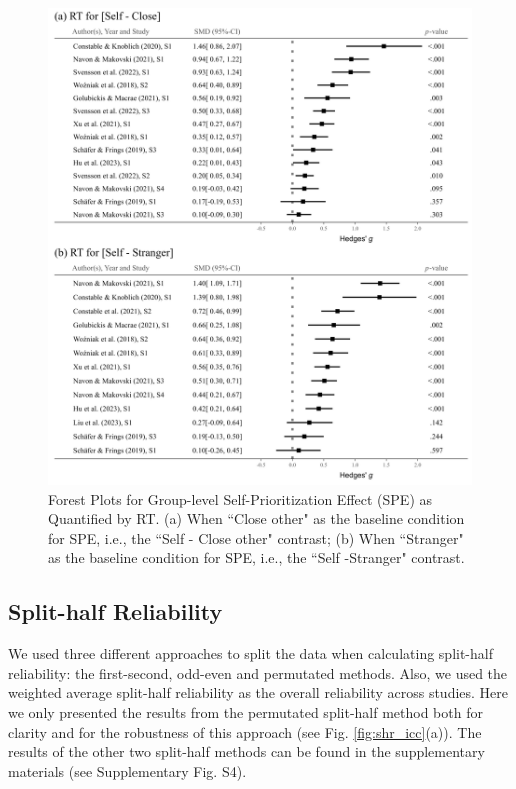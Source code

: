 \documentclass[sn-apa]{sn-jnl}%
\theoremstyle{thmstyleone}%
\theoremstyle{thmstyletwo}%
\theoremstyle{thmstylethree}%
\begin{document}
\begin{figure}[!hb]
	\centering
	\includegraphics[width=1\textwidth]{./Figure/Fig_3_Forest_RT.png}
	\caption{Forest Plots for Group-level Self-Prioritization Effect (SPE) as Quantified by RT. (a) When ``Close other" as the baseline condition for SPE, i.e., the ``Self - Close other" contrast; (b) When ``Stranger" as the baseline condition for SPE, i.e., the ``Self -Stranger" contrast.}
	\label{fig:meta_RT}
\end{figure}
\clearpage

\subsection{Split-half Reliability}\label{subsec:split}

We used three different approaches to split the data when calculating split-half reliability: the first-second, odd-even and permutated methods. Also, we used the weighted average split-half reliability as the overall reliability across studies. Here we only presented the results from the permutated split-half method both for clarity and for the robustness of this approach \parencite{pronk2022methods} (see Fig. \ref{fig:shr_icc}(a)). The results of the other two split-half methods can be found in the supplementary materials (see Supplementary Fig. S4).
\end{document}
